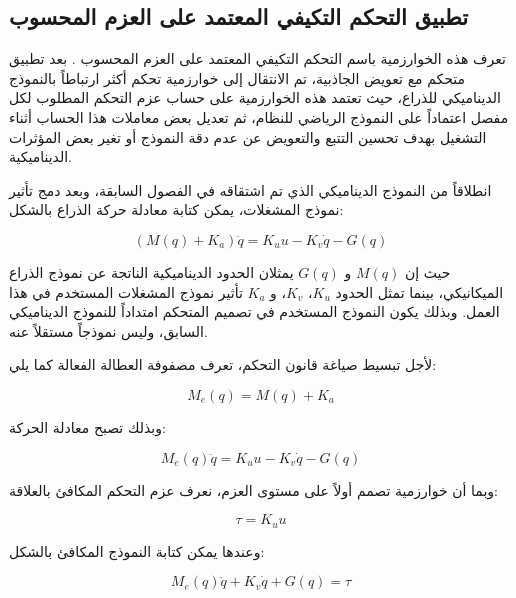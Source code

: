 \subsection{تطبيق التحكم التكيفي المعتمد على العزم المحسوب }
\label{subsec:adaptive_computed_torque_control}

تعرف هذه الخوارزمية باسم التحكم التكيفي المعتمد على العزم المحسوب . بعد تطبيق متحكم  مع تعويض الجاذبية، تم الانتقال إلى خوارزمية تحكم أكثر ارتباطاً بالنموذج الديناميكي للذراع، حيث تعتمد هذه الخوارزمية على حساب عزم التحكم المطلوب لكل مفصل اعتماداً على النموذج الرياضي للنظام، ثم تعديل بعض معاملات هذا الحساب أثناء التشغيل بهدف تحسين التتبع والتعويض عن عدم دقة النموذج أو تغير بعض المؤثرات الديناميكية.

انطلاقاً من النموذج الديناميكي الذي تم اشتقاقه في الفصول السابقة، وبعد دمج تأثير نموذج المشغلات، يمكن كتابة معادلة حركة الذراع بالشكل:

\begin{equation}
\left(M(q)+K_a\right)\ddot{q}
=
K_u u
-
K_v\dot{q}
-
G(q)
\label{eq:actc_dynamic_model_voltage}
\end{equation}

حيث إن \(M(q)\) و \(G(q)\) يمثلان الحدود الديناميكية الناتجة عن نموذج الذراع الميكانيكي، بينما تمثل الحدود \(K_u\)، \(K_v\)، و \(K_a\) تأثير نموذج المشغلات المستخدم في هذا العمل. وبذلك يكون النموذج المستخدم في تصميم المتحكم امتداداً للنموذج الديناميكي السابق، وليس نموذجاً مستقلاً عنه.

لأجل تبسيط صياغة قانون التحكم، تعرف مصفوفة العطالة الفعالة كما يلي:

\begin{equation}
M_e(q)=M(q)+K_a
\label{eq:actc_effective_inertia}
\end{equation}

وبذلك تصبح معادلة الحركة:

\begin{equation}
M_e(q)\ddot{q}
=
K_u u
-
K_v\dot{q}
-
G(q)
\label{eq:actc_effective_model_voltage}
\end{equation}

وبما أن خوارزمية  تصمم أولاً على مستوى العزم، نعرف عزم التحكم المكافئ بالعلاقة:

\begin{equation}
\tau = K_u u
\label{eq:actc_torque_voltage_relation}
\end{equation}

وعندها يمكن كتابة النموذج المكافئ بالشكل:

\begin{equation}
M_e(q)\ddot{q}
+
K_v\dot{q}
+
G(q)
=
\tau
\label{eq:actc_mechanical_model}
\end{equation}


